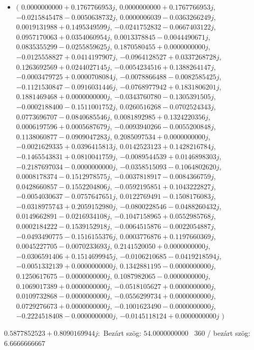 \documentclass[14pt,a4paper]{article}
\begin{document}
\begin{itemize}
\item
$\big($
$0.0000000000+0.1767766953j$, $0.0000000000+0.1767766953j$, $-0.0215845478-0.0050638732j$, $0.0000006039-0.0363266249j$, $0.0019131988+0.1495349599j$, $-0.0241752832-0.0667403122j$, $0.0957170063+0.0354060954j$, $0.0013378845-0.0044490671j$, $0.0835355299-0.0255859625j$, $0.1870580455+0.0000000000j$, $-0.0125558827+0.0414197907j$, $-0.0964128527+0.0337268728j$, $0.1263692569+0.0244027145j$, $-0.0054234516+0.1388264147j$, $-0.0003479725+0.0000708084j$, $-0.0078866488-0.0082585425j$, $-0.1121530847-0.0916031446j$, $-0.0768977942+0.1831806201j$, $0.1881469468+0.0000000000j$, $-0.0343760780-0.1305391505j$, $-0.0002188400-0.1511001752j$, $0.0260516268-0.0702524343j$, $0.0773696707-0.0840685546j$, $0.0081892985+0.1324220356j$, $0.0006197596+0.0005687679j$, $-0.0093940266-0.0055200848j$, $0.1138060877-0.0909047283j$, $0.2085097534+0.0000000000j$, $-0.0021629335+0.0396415813j$, $0.0142523123+0.1428216784j$, $-0.1465543831+0.0810041759j$, $-0.0089544539+0.0146898303j$, $-0.2187697034-0.0000000000j$, $-0.0358515093-0.1064802620j$, $0.0008178374-0.1512978575j$, $-0.0037818917-0.0084366759j$, $0.0428660857-0.1552204806j$, $-0.0592195851+0.1043222827j$, $-0.0054030637-0.0757647651j$, $0.0122769491-0.1508176083j$, $-0.0318975743+0.2059152980j$, $-0.0800228546-0.0488260432j$, $0.0149662891-0.0216934108j$, $-0.1047158965+0.0552985768j$, $0.0002184222-0.1539152918j$, $-0.0064515876-0.0022054887j$, $-0.0493490775-0.1516155376j$, $0.0003776876+0.1197660369j$, $0.0045227705-0.0070233693j$, $0.2141520050+0.0000000000j$, $-0.0306591406+0.1514699945j$, $-0.0106210685-0.0419218594j$, $-0.0051332139+0.0000000000j$, $0.1342881195-0.0000000000j$, $0.1250617675-0.0000000000j$, $0.1087982065-0.0000000000j$, $0.1069017389+0.0000000000j$, $-0.0518105627+0.0000000000j$, $0.0109732868-0.0000000000j$, $-0.0556299734+0.0000000000j$, $0.0729276673+0.0000000000j$, $-0.1001623490-0.0000000000j$, $-0.2224518408-0.0000000000j$, $-0.0145118124+0.0000000000j$
$\big)$
\end{itemize}
$0.5877852523+0.8090169944j$:\
Bezárt szög: $54.0000000000$ \
360 / bezárt szög: $6.6666666667$\
\end{document}
